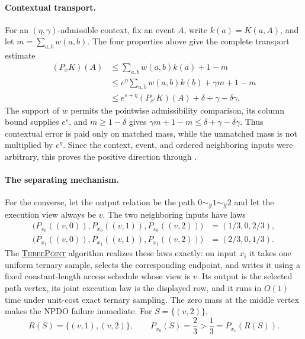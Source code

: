 \documentclass[11pt]{article}
\begin{document}
\paragraph{Contextual transport.}
For an $(\eta,\gamma)$-admissible context, fix an event $A$, write
$k(a)=K(a,A)$, and let $m=\sum_{a,b}w(a,b)$.  The four properties above give
the complete transport estimate
\begin{align*}
 (P_xK)(A)
 &\leq \sum_{a,b}w(a,b)k(a)+1-m\\
 &\leq e^\eta\sum_{a,b}w(a,b)k(b)+\gamma m+1-m\\
 &\leq e^{\varepsilon+\eta}(P_{x'}K)(A)
       +\delta+\gamma-\delta\gamma.
\end{align*}
The support of $w$ permits the pointwise admissibility comparison, its column
bound supplies $e^\varepsilon$, and $m\geq1-\delta$ gives
$\gamma m+1-m\leq\delta+\gamma-\delta\gamma$.  Thus contextual error is paid
only on matched mass, while the unmatched mass is not multiplied by $e^\eta$.
Since the context,
event, and ordered neighboring inputs were arbitrary, this proves the positive
direction through .

\paragraph{The separating mechanism.}
For the converse, let the output relation be the path
$0\sim_{\mathcal Y}1\sim_{\mathcal Y}2$ and let the execution view always be
$v$.  The two neighboring inputs have laws
\[
 \begin{aligned}
 \bigl(P_{x_0}((v,0)),P_{x_0}((v,1)),P_{x_0}((v,2))\bigr)
   &=(1/3,0,2/3),\\
 \bigl(P_{x_1}((v,0)),P_{x_1}((v,1)),P_{x_1}((v,2))\bigr)
   &=(2/3,0,1/3).
 \end{aligned}
\]
The \hyperref[alg:three-point]{\textsc{ThreePoint}} algorithm realizes these
laws exactly: on input $x_i$ it takes one uniform ternary sample, selects the
corresponding endpoint, and writes it using a fixed constant-length access
schedule whose view is $v$.  Its output is the selected path vertex, its joint
execution law is the displayed row, and it runs in $O(1)$ time under unit-cost
exact ternary sampling.  The zero mass at the middle vertex makes the NPDO
failure immediate.  For $S=\{(v,2)\}$,
\[
 R(S)=\{(v,1),(v,2)\},
 \qquad
 P_{x_0}(S)=\frac23>\frac13=P_{x_1}(R(S)).
\]
\end{document}
